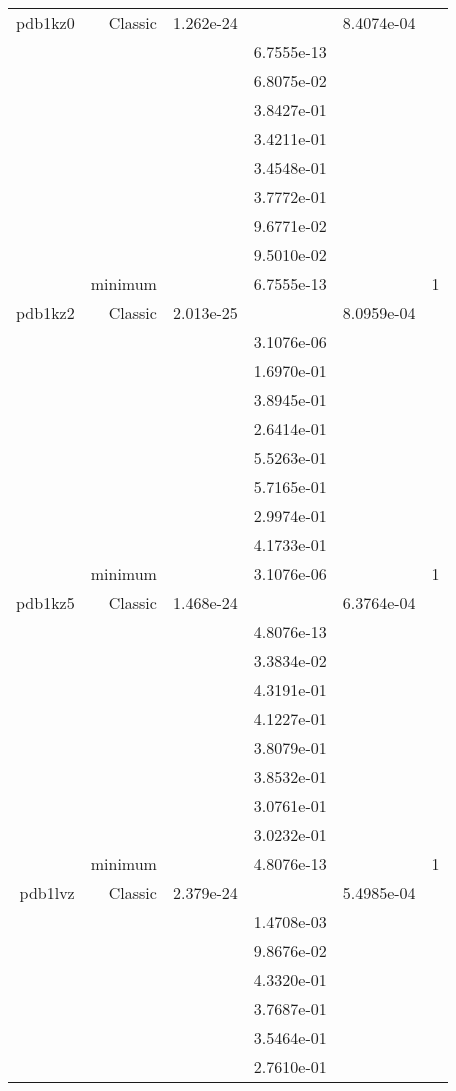\begin{xltabular}{\textwidth}{r|rS[table-format=1.3e+2]S[table-format=1.4e+2]S[table-format=1.4e+2]S[table-format=-1.5]}
pdb1kz0 & Classic & 1.262e-24 &  & 8.4074e-04 & \\
&  &  & 6.7555e-13 & & \\
&  &  & 6.8075e-02 & & \\
&  &  & 3.8427e-01 & & \\
&  &  & 3.4211e-01 & & \\
&  &  & 3.4548e-01 & & \\
&  &  & 3.7772e-01 & & \\
&  &  & 9.6771e-02 & & \\
&  &  & 9.5010e-02 & & \\
& minimum &  & 6.7555e-13 & & 1 \\  \addlinespace
pdb1kz2 & Classic & 2.013e-25 &  & 8.0959e-04 & \\
&  &  & 3.1076e-06 & & \\
&  &  & 1.6970e-01 & & \\
&  &  & 3.8945e-01 & & \\
&  &  & 2.6414e-01 & & \\
&  &  & 5.5263e-01 & & \\
&  &  & 5.7165e-01 & & \\
&  &  & 2.9974e-01 & & \\
&  &  & 4.1733e-01 & & \\
& minimum &  & 3.1076e-06 & & 1 \\  \addlinespace
pdb1kz5 & Classic & 1.468e-24 &  & 6.3764e-04 & \\
&  &  & 4.8076e-13 & & \\
&  &  & 3.3834e-02 & & \\
&  &  & 4.3191e-01 & & \\
&  &  & 4.1227e-01 & & \\
&  &  & 3.8079e-01 & & \\
&  &  & 3.8532e-01 & & \\
&  &  & 3.0761e-01 & & \\
&  &  & 3.0232e-01 & & \\
& minimum &  & 4.8076e-13 & & 1 \\  \addlinespace
pdb1lvz & Classic & 2.379e-24 &  & 5.4985e-04 & \\
&  &  & 1.4708e-03 & & \\
&  &  & 9.8676e-02 & & \\
&  &  & 4.3320e-01 & & \\
&  &  & 3.7687e-01 & & \\
&  &  & 3.5464e-01 & & \\
&  &  & 2.7610e-01 & & \\

\end{xltabular}
